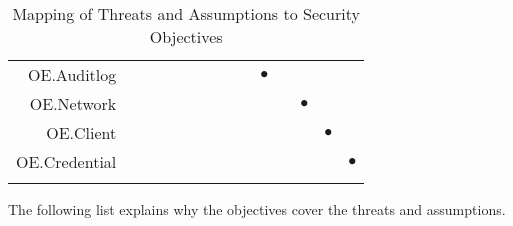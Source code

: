 \documentclass[12pt,english]{scrbook}
\newcommand{\oh}{$\bullet$}
\begin{document}
\begin{longtable}{r|R|R|R|R|R|R|R|R|R|R|R|R|R|}
OE.Auditlog  &       &       &            &            &               &             &             &        & \oh  &         &         &            &                   \\  
OE.Network   &       &       &            &            &               &             &             &        &      &         &  \oh    &            &                   \\   
OE.Client    &       &       &            &            &               &             &             &        &      &         &         &    \oh     &                   \\
OE.Credential&       &       &            &            &               &             &             &        &      &         &         &            &    \oh    \\ 
\bottomrule
  \caption{Mapping of Threats and Assumptions to Security Objectives}
  \label{tab-SOR}
\end{longtable}

The following list explains why the objectives cover
the threats and assumptions.
\end{document}
